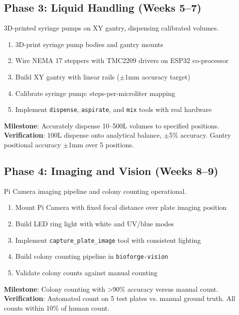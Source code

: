 \documentclass[11pt,letterpaper]{article}
\begin{document}
\subsection{Phase 3: Liquid Handling (Weeks 5--7)}
3D-printed syringe pumps on XY gantry, dispensing calibrated volumes.

\begin{enumerate}
  \item 3D-print syringe pump bodies and gantry mounts
  \item Wire NEMA 17 steppers with TMC2209 drivers on ESP32 co-processor
  \item Build XY gantry with linear rails ($\pm$1mm accuracy target)
  \item Calibrate syringe pump: steps-per-microliter mapping
  \item Implement \texttt{dispense}, \texttt{aspirate}, and \texttt{mix} tools with real hardware
\end{enumerate}

\textbf{Milestone}: Accurately dispense 10--500\textmu{}L volumes to specified positions.\\
\textbf{Verification}: 100\textmu{}L dispense onto analytical balance, $\pm$5\% accuracy. Gantry positional accuracy $\pm$1mm over 5 positions.

\subsection{Phase 4: Imaging and Vision (Weeks 8--9)}
Pi Camera imaging pipeline and colony counting operational.

\begin{enumerate}
  \item Mount Pi Camera with fixed focal distance over plate imaging position
  \item Build LED ring light with white and UV/blue modes
  \item Implement \texttt{capture\_plate\_image} tool with consistent lighting
  \item Build colony counting pipeline in \texttt{bioforge-vision}
  \item Validate colony counts against manual counting
\end{enumerate}

\textbf{Milestone}: Colony counting with >90\% accuracy versus manual count.\\
\textbf{Verification}: Automated count on 5 test plates vs. manual ground truth. All counts within 10\% of human count.
\end{document}
